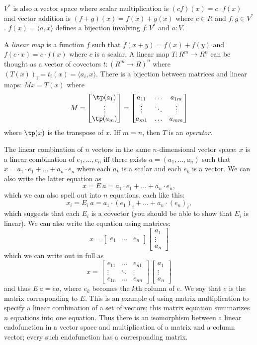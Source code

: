 \(V^*\) is also a vector space
where scalar multiplication is
\((cf)(x) = c \cdot f(x)\)
and vector addition is
\((f+g)(x) = f(x)+g(x)\)
where \(c \in R\) and \(f,g \in V^*\).
\(f(x) = \langle a,x\rangle\) defines a bijection involving \(f:V^*\) and \(a:V\).

A \emph{linear map} is a function \(f\) such that \(f(x+y) = f(x) + f(y)\)
and \(f(c \cdot x) = c \cdot f(x)\) where \(c\) is a scalar.
A linear map \(T : R^m \to R^n\) can be thought
as a vector of covectors \(t : (R^m \to R)^n\) where
\(
(T(x))_i = t_i(x) = \langle a_i, x \rangle
\).
There is a bijection between matrices and linear maps:
\(Mx = T(x)\) where
\[
M = \begin{bmatrix}\tp(a_1)\\\vdots\\\tp(a_m)\end{bmatrix}
= \begin{bmatrix}a_{11} & \ldots & a_{1m} \\ \vdots & \ddots & \vdots \\ a_{m1} & \ldots & a_{mm}\end{bmatrix}
\]
where \(\tp(x)\) is the transpose of \(x\).
Iff $m = n$, then \(T\) is an \emph{operator}.

The linear combination of \(n\) vectors in the same \(n\)-dimensional vector space:
\(x\) is a linear combination of \(e_1,\ldots,e_n\)
iff there exists \(a = (a_1,\ldots,a_n)\)
such that \(x = a_1 \cdot e_1 + \ldots + a_n \cdot e_n\)
where each \(a_k\) is a scalar and each \(e_k\) is a vector.
We can also write the latter equation as
\[
x = E~a = a_1 \cdot e_1 + \ldots + a_n \cdot e_n,
\]
which we can also spell out into $n$ equations, each like this:
\[
x_i = E_i~a = a_1 \cdot (e_1)_i + \ldots + a_n \cdot (e_n)_i,
\]
which suggests that each $E_i$ is a covector
(you should be able to show that $E_i$ is linear).
We can also write the equation using matrices:
\[
x =
\begin{bmatrix}
e_1 & \ldots & e_n
\end{bmatrix}
\begin{bmatrix}
a_1 \\ \vdots \\ a_n
\end{bmatrix}
\]
which we can write out in full as
\[
x =
\begin{bmatrix}
e_{11} & \ldots & e_{n1}
\\ \vdots & \ddots & \vdots
\\ e_{1n} & \ldots & e_{nn}
\end{bmatrix}
\begin{bmatrix}
a_1 \\ \vdots \\ a_n
\end{bmatrix}
\]
and thus $E~a = ea$,
where $e_k$ becomes the $k$th column of $e$.
We say that $e$ is the matrix corresponding to $E$.
This is an example of using matrix multiplication to specify
a linear combination of a set of vectors;
this matrix equation summarizes $n$ equations into one equation.
Thus there is an isomorphism between a linear endofunction in a vector space
and multiplication of a matrix and a column vector;
every such endofunction has a corresponding matrix.


